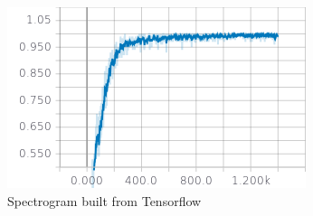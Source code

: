 \documentclass[12pt,journal,compsoc]{IEEEtran}
\begin{document}
\begin{figure}[h]
\caption{Spectrogram built from Tensorflow}
\vspace{5mm}
\includegraphics[scale=.7]{second}
\end{figure}

%




\end{document}
